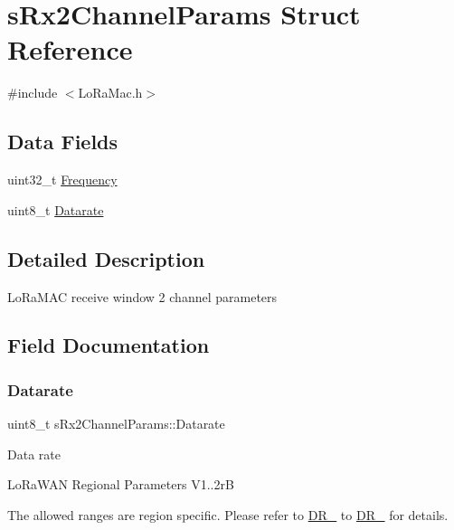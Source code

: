 \hypertarget{structsRx2ChannelParams}{}\section{s\+Rx2\+Channel\+Params Struct Reference}
\label{structsRx2ChannelParams}


{\ttfamily \#include $<$Lo\+Ra\+Mac.\+h$>$}

\subsection*{Data Fields}
\begin{DoxyCompactItemize}
\item 
uint32\+\_\+t \hyperlink{structsRx2ChannelParams_a49737d85a2306a64e5fec08f2b564c52}{Frequency}
\item 
uint8\+\_\+t \hyperlink{structsRx2ChannelParams_aed285208f9d763e511e80ec2b3d7f526}{Datarate}
\end{DoxyCompactItemize}


\subsection{Detailed Description}
Lo\+Ra\+M\+AC receive window 2 channel parameters 

\subsection{Field Documentation}
\mbox{\label{structsRx2ChannelParams_aed285208f9d763e511e80ec2b3d7f526}} 
\subsubsection{\texorpdfstring{Datarate}{Datarate}}
{\footnotesize\ttfamily uint8\+\_\+t s\+Rx2\+Channel\+Params\+::\+Datarate}

Data rate

Lo\+Ra\+W\+AN Regional Parameters V1..\+2rB

The allowed ranges are region specific. Please refer to \hyperlink{group__REGION_ga6c4ef966b4f3d5eb7597b087f2b97095}{D\+R\+\_} to \hyperlink{group__REGION_gac6e078f51b71f05093daf27834997396}{D\+R\+\_} for details. \mbox{\label{structsRx2ChannelParams_a49737d85a2306a64e5fec08f2b564c52}} 
